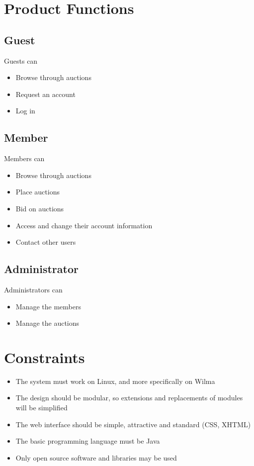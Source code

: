 \documentclass[a4paper, 12pt]{report}
\begin{document}
\section{Product Functions}
	\subsection{Guest}
		Guests can
		\begin{itemize}
			\item Browse through auctions
			\item Request an account
			\item Log in
		\end{itemize}
	\subsection{Member}
		Members can
		\begin{itemize}
			\item Browse through auctions
			\item Place auctions
			\item Bid on auctions
			\item Access and change their account information
			\item Contact other users
		\end{itemize}
	\subsection{Administrator}
		Administrators can
		\begin{itemize}
			\item Manage the members
			\item Manage the auctions
		\end{itemize}
\section{Constraints}
\begin{itemize}
	\item The system must work on Linux, and more specifically on Wilma
	\item The design should be modular, so extensions and replacements of 
	modules will be simplified
	\item The web interface should be simple, attractive and standard
	(CSS, XHTML)
	\item The basic programming language must be Java
	\item Only open source software and libraries may be used
\end{itemize}
\end{document}
